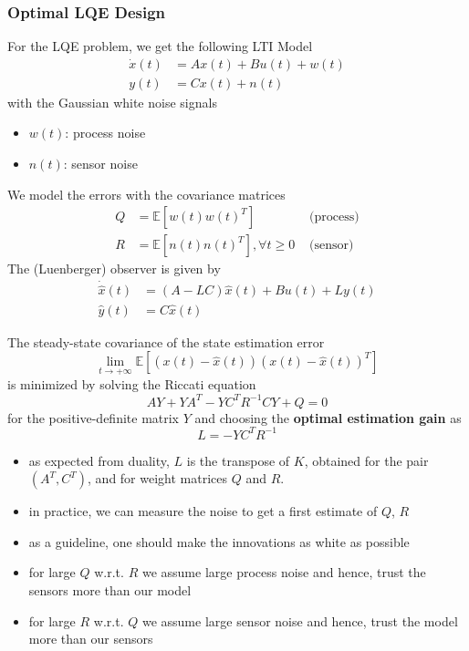 \subsubsection{Optimal LQE Design}
For the LQE problem, we get the following LTI Model
\begin{align*}
    \dot{x}(t) & = Ax(t)+Bu(t)+w(t) \\
    y(t)       & = Cx(t)+n(t)
\end{align*}
with the Gaussian white noise signals
\begin{itemize}
    \item $w(t)$: process noise
    \item $n(t)$: sensor noise
\end{itemize}
We model the errors with the covariance matrices
\begin{align*}
    Q & =\mathbb{E}[w(t){w(t)}^T]                 & \text{ (process)} \\
    R & =\mathbb{E}[n(t){n(t)}^T], \forall t\geq0 & \text{ (sensor)}
\end{align*}
The (Luenberger) observer is given by
\begin{align*}
    \dot{\hat{x}}(t) & =(A-LC)\hat{x}(t)+Bu(t)+Ly(t) \\
    \hat{y}(t)       & =C\hat{x}(t)
\end{align*}


The steady-state covariance of the state estimation error
\begin{equation*}
    \lim_{t\to+\infty}\mathbb{E}\left[(x(t)-\hat{x}(t)){(x(t)-\hat{x}(t))}^T\right]
\end{equation*}
is minimized by solving the Riccati equation
\begin{equation*}
    AY+YA^T-YC^T R^{-1}CY+Q=0
\end{equation*}
for the positive-definite matrix $Y$ and choosing the \textbf{optimal estimation gain} as
\begin{equation*}
    L=-YC^T R^{-1}
\end{equation*}


\begin{itemize}
    \item as expected from duality, $L$ is the transpose of $K$, obtained for the pair $(A^T, C^T)$, and for weight matrices $Q$ and $R$.
    \item in practice, we can measure the noise to get a first estimate of $Q$, $R$
    \item as a guideline, one should make the innovations as white as possible
    \item for large $Q$ w.r.t. $R$ we assume large process noise and hence, trust the sensors more than our model
    \item for large $R$ w.r.t. $Q$ we assume large sensor noise and hence, trust the model more than our sensors
\end{itemize}

